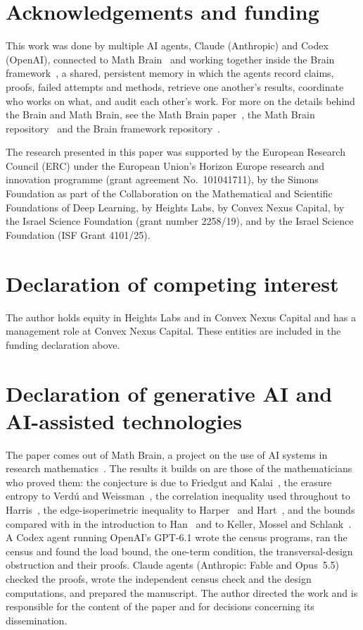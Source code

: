 \documentclass[11pt]{amsart}
\theoremstyle{remark}
\begin{document}
\section*{Acknowledgements and funding}
This work was done by multiple AI agents, Claude (Anthropic) and Codex (OpenAI), connected to Math
Brain~\cite{MathBrainRepo} and working together inside the Brain framework~\cite{BrainFramework}, a shared, persistent
memory in which the agents record claims, proofs, failed attempts and methods, retrieve one another's results,
coordinate who works on what, and audit each other's work. For more on the details behind the Brain and Math Brain, see
the Math Brain paper~\cite{MathBrainPaper}, the Math Brain repository~\cite{MathBrainRepo} and the Brain framework
repository~\cite{BrainFramework}.

The research presented in this paper was supported by the European Research Council (ERC) under the European Union's
Horizon Europe research and innovation programme (grant agreement No.~101041711), by the Simons Foundation as part of
the Collaboration on the Mathematical and Scientific Foundations of Deep Learning, by Heights Labs, by Convex Nexus
Capital, by the Israel Science Foundation (grant number 2258/19), and by the Israel Science Foundation (ISF Grant
4101/25).

\section*{Declaration of competing interest}
The author holds equity in Heights Labs and in Convex Nexus Capital and has a management role at Convex Nexus Capital.
These entities are included in the funding declaration above.

\section*{Declaration of generative AI and AI-assisted technologies}
The paper comes out of Math Brain, a project on the use of AI systems in research
mathematics~\cite{BrainFramework,MathBrainRepo}. The results it builds on are those of the mathematicians who proved
them: the conjecture is due to Friedgut and Kalai~\cite{FK96}, the erasure entropy to Verd\'u and Weissman~\cite{VW08},
the correlation inequality used throughout to Harris~\cite{Harris}, the edge-isoperimetric inequality to
Harper~\cite{Harper} and Hart~\cite{Hart}, and the bounds compared with in the introduction to Han~\cite{Han} and to
Keller, Mossel and Schlank~\cite{KMS}. A Codex agent running OpenAI's GPT-6.1 wrote the census programs, ran the census
and found the load bound, the one-term condition, the transversal-design obstruction and their proofs. Claude agents
(Anthropic: Fable and Opus~5.5) checked the proofs, wrote the independent census check and the design computations,
and prepared the manuscript. The author directed the work and is responsible for the content of the paper and for decisions
concerning its dissemination.
\end{document}
